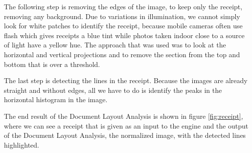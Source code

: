 The following step is removing the edges of the image, to keep only the receipt, removing any background. Due to variations in illumination, we cannot simply look for white patches to identify the receipt, because mobile cameras often use flash which gives receipts a blue tint while photos taken indoor close to a source of light have a yellow hue. The approach that was used was to look at the horizontal and vertical projections and to remove the section from the top and bottom that is over a threshold. 

The last step is detecting the lines in the receipt. Because the images are already straight and without edges, all we have to do is identify the peaks in the horizontal histogram in the image.  

The end result of the Document Layout Analysis is shown in figure \ref{fig:receipt}, where we can see a receipt that is given as an input to the engine and the output of the Document Layout Analysis, the normalized image, with the detected lines highlighted.